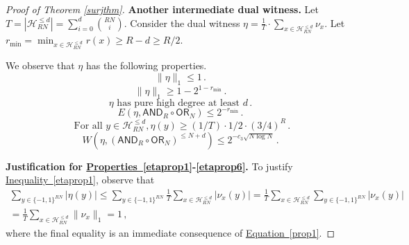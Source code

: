 \documentclass[11pt]{article}
\numberwithin{equation}{section}
\theoremstyle{definition}
\theoremstyle{plain}
\newcommand{\expeqref}[2]{\hyperref[#2]{#1~\eqref{#2}}}
\newcommand{\OR}{\mathsf{ OR}}
\newcommand{\bits}{\{-1,1\}}
\newcommand{\Hcal}{\mathcal{H}}
\newcommand{\AND}{\mathsf{AND}}
\begin{document}
\begin{proof}[Proof of Theorem \ref{surjthm}]
	\medskip
	\noindent \textbf{Another intermediate dual witness.}
	Let $T=|\Hcal_{RN}^{\leq d}| = \sum_{i=0}^d {RN \choose i}$. Consider the dual witness $\eta=\frac1T \cdot \sum_{x \in \Hcal^{\leq d}_{RN}} \nu_x$. 
	Let $r_{\text{min}} = \min_{x \in \mathcal{H}_{RN}^{\leq d}} r(x) \geq R-d \geq R/2$. 
	
%
%
%
We observe that $\eta$ has the following properties. %
	\begin{equation}
	\label{etaprop1}
	\|\eta\|_1 \leq 1\,. 
	\end{equation}
	\begin{equation}
	\label{etaprop1prime}
	\|\eta\|_1 \ge  1-2^{1-r_{\text{min}}} \,.
	\end{equation} 
	\begin{equation}
	\label{etaprop2}
	\eta \text{ has pure high degree at least } d\,.
	\end{equation}
	\begin{equation} \label{etaprop3} E(\eta, \AND_R \circ \OR_N) \leq 2^{-r_{\text{min}}}\,.
	\end{equation}
	\begin{equation}
	\text{ For all } y \in \mathcal{H}^{\leq d}_{RN}, \eta(y) \geq (1/T) \cdot 1/2 \cdot (3/4)^{R}\,.
	\label{etaprop5}
	\end{equation} %
	\begin{equation} %
	W(\eta, (\AND_R \circ \OR_N)^{\leq N + d}) \leq 2^{-c_3 \sqrt{N \log N}}\,.
	\label{etaprop6}
	\end{equation}
	
	\medskip \noindent \textbf{Justification for \expeqref{Properties}{etaprop1}-\eqref{etaprop6}.}
	To justify \expeqref{Inequality}{etaprop1}, observe that
	\begin{align*} \sum_{y \in \bits^{RN}} |\eta(y)| \leq \sum_{y \in \bits^{RN}}\frac1T \sum_{x \in \Hcal^{\leq d}_{RN}} |\nu_x(y)|
	=\frac1T \sum_{x \in \Hcal^{\leq d}_{RN}}  \sum_{y \in \bits^{RN}} |\nu_x(y)|\\ =
	\frac1T \sum_{x \in \Hcal^{\leq d}_{RN}} \|\nu_x\|_1= 1\,,
	\end{align*}
	where the final equality is an immediate  consequence of \expeqref{Equation}{prop1}.
	

\end{proof}
\end{document}
